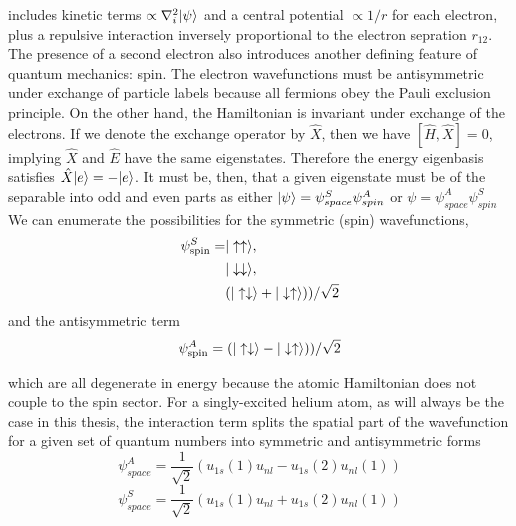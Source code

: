 	\noindent includes kinetic terms $\propto\nabla_i^2|\psi\rangle$ and a central potential $\propto 1/r$ for each electron, plus a repulsive interaction inversely proportional to the electron sepration $r_{12}$. The presence of a second electron also introduces another defining feature of quantum mechanics: spin. The electron wavefunctions must be antisymmetric under exchange of particle labels because all fermions obey the Pauli exclusion principle. On the other hand, the Hamiltonian is invariant under exchange of the electrons. If we denote the exchange operator by $\hat{X}$, then we have $[\hat{H},\hat{X}] = 0$, implying $\hat{X}$ and $\hat{E}$ have the same eigenstates. Therefore the energy eigenbasis satisfies $\hat{X}|e\rangle = -|e\rangle$. 
	It must be, then, that a given eigenstate must be of the separable into odd and even parts as either $|\psi\rangle =  \psi^{S}_{space}\psi^{A}_{spin}$ or $\psi=\psi^{A}_{space}\psi^{S}_{spin}$
	We can enumerate the possibilities for the symmetric (spin) wavefunctions, 
	\begin{align}
	\psi^S_\text{spin} =& |\uparrow\uparrow\rangle,\\
		&|\downarrow\downarrow\rangle,\\
		&(|\uparrow\downarrow\rangle+|\downarrow\uparrow\rangle))/\sqrt{2}
	\end{align}
	 and the antisymmetric term
	\begin{equation}
	\psi^A_\text{spin} = (|\uparrow\downarrow\rangle-|\downarrow\uparrow\rangle))/\sqrt{2}
	\end{equation}

	\noindent which are all degenerate in energy because the atomic Hamiltonian does not couple to the spin sector. For a singly-excited helium atom, as will always be the case in this thesis, the interaction term splits the spatial part of the wavefunction for a given set of quantum numbers into symmetric and antisymmetric forms
	$$
	\psi^{A}_{space} = \frac{1}{\sqrt{2}}\left(u_{1s}(1)u_{nl} - u_{1s}(2)u_{nl}(1)\right)
	$$
	$$
	\psi^{S}_{space} = \frac{1}{\sqrt{2}}\left(u_{1s}(1)u_{nl} + u_{1s}(2)u_{nl}(1)\right)
	$$


